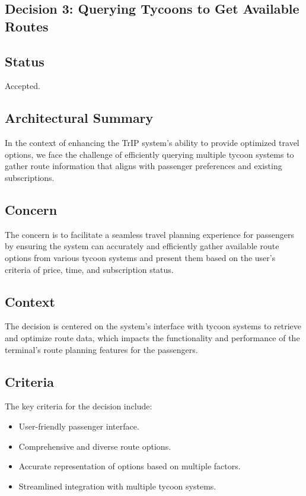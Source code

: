 \subsection{Decision 3: Querying Tycoons to Get Available Routes}

\subsection*{Status}
Accepted.

\subsection*{Architectural Summary}
In the context of enhancing the TrIP system's ability to provide optimized travel options, we face the challenge of efficiently querying multiple tycoon systems to gather route information that aligns with passenger preferences and existing subscriptions.

\subsection*{Concern}
The concern is to facilitate a seamless travel planning experience for passengers by ensuring the system can accurately and efficiently gather available route options from various tycoon systems and present them based on the user's criteria of price, time, and subscription status.

\subsection*{Context}
The decision is centered on the system's interface with tycoon systems to retrieve and optimize route data, which impacts the functionality and performance of the terminal's route planning features for the passengers.

\subsection*{Criteria}
The key criteria for the decision include:
\begin{itemize}
    \item User-friendly passenger interface.
    \item Comprehensive and diverse route options.
    \item Accurate representation of options based on multiple factors.
    \item Streamlined integration with multiple tycoon systems.
\end{itemize}

